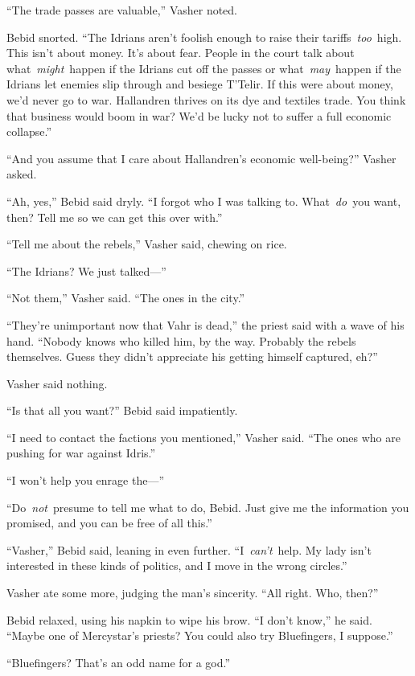 “The trade passes are valuable,” Vasher noted.

Bebid snorted. “The Idrians aren’t foolish enough to raise their tariffs~\textit{too}~high. This isn’t about money. It’s about fear. People in the court talk about what~\textit{might}~happen if the Idrians cut off the passes or what~\textit{may}~happen if the Idrians let enemies slip through and besiege T’Telir. If this were about money, we’d never go to war. Hallandren thrives on its dye and textiles trade. You think that business would boom in war? We’d be lucky not to suffer a full economic collapse.”

“And you assume that I care about Hallandren’s economic well-being?” Vasher asked.

“Ah, yes,” Bebid said dryly. “I forgot who I was talking to. What~\textit{do}~you want, then? Tell me so we can get this over with.”

“Tell me about the rebels,” Vasher said, chewing on rice.

“The Idrians? We just talked—”

“Not them,” Vasher said. “The ones in the city.”

“They’re unimportant now that Vahr is dead,” the priest said with a wave of his hand. “Nobody knows who killed him, by the way. Probably the rebels themselves. Guess they didn’t appreciate his getting himself captured, eh?”

Vasher said nothing.

“Is that all you want?” Bebid said impatiently.

“I need to contact the factions you mentioned,” Vasher said. “The ones who are pushing for war against Idris.”

“I won’t help you enrage the—”

“Do~\textit{not}~presume to tell me what to do, Bebid. Just give me the information you promised, and you can be free of all this.”

“Vasher,” Bebid said, leaning in even further. “I~\textit{can’t}~help. My lady isn’t interested in these kinds of politics, and I move in the wrong circles.”

Vasher ate some more, judging the man’s sincerity. “All right. Who, then?”

Bebid relaxed, using his napkin to wipe his brow. “I don’t know,” he said. “Maybe one of Mercystar’s priests? You could also try Bluefingers, I suppose.”

“Bluefingers? That’s an odd name for a god.”

